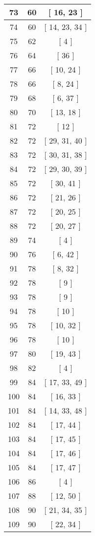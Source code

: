 \begin{center}
\begin{longtable}[H]{|| c c c ||}
73 & 60 & [ 16, 23 ] \\ 
\hline
74 & 60 & [ 14, 23, 34 ] \\ 
\hline
75 & 62 & [ 4 ] \\ 
\hline
76 & 64 & [ 36 ] \\ 
\hline
77 & 66 & [ 10, 24 ] \\ 
\hline
78 & 66 & [ 8, 24 ] \\ 
\hline
79 & 68 & [ 6, 37 ] \\ 
\hline
80 & 70 & [ 13, 18 ] \\ 
\hline
81 & 72 & [ 12 ] \\ 
\hline
82 & 72 & [ 29, 31, 40 ] \\ 
\hline
83 & 72 & [ 30, 31, 38 ] \\ 
\hline
84 & 72 & [ 29, 30, 39 ] \\ 
\hline
85 & 72 & [ 30, 41 ] \\ 
\hline
86 & 72 & [ 21, 26 ] \\ 
\hline
87 & 72 & [ 20, 25 ] \\ 
\hline
88 & 72 & [ 20, 27 ] \\ 
\hline
89 & 74 & [ 4 ] \\ 
\hline
90 & 76 & [ 6, 42 ] \\ 
\hline
91 & 78 & [ 8, 32 ] \\ 
\hline
92 & 78 & [ 9 ] \\ 
\hline
93 & 78 & [ 9 ] \\ 
\hline
94 & 78 & [ 10 ] \\ 
\hline
95 & 78 & [ 10, 32 ] \\ 
\hline
96 & 78 & [ 10 ] \\ 
\hline
97 & 80 & [ 19, 43 ] \\ 
\hline
98 & 82 & [ 4 ] \\ 
\hline
99 & 84 & [ 17, 33, 49 ] \\ 
\hline
100 & 84 & [ 16, 33 ] \\ 
\hline
101 & 84 & [ 14, 33, 48 ] \\ 
\hline
102 & 84 & [ 17, 44 ] \\ 
\hline
103 & 84 & [ 17, 45 ] \\ 
\hline
104 & 84 & [ 17, 46 ] \\ 
\hline
105 & 84 & [ 17, 47 ] \\ 
\hline
106 & 86 & [ 4 ] \\ 
\hline
107 & 88 & [ 12, 50 ] \\ 
\hline
108 & 90 & [ 21, 34, 35 ] \\ 
\hline
109 & 90 & [ 22, 34 ] \\ 

\end{longtable}
\end{center}
